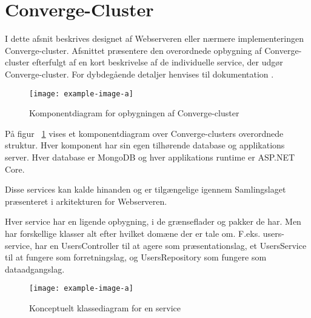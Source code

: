 \section{Converge-Cluster}

I dette afsnit beskrives designet af Webserveren eller nærmere implementeringen Converge-cluster. Afsnittet præsentere den overordnede opbygning af Converge-cluster efterfulgt af en kort beskrivelse af de individuelle service, der udgør Converge-cluster. For dybdegående detaljer henvises til dokumentation .


\begin{figure}
  \begin{small}
    \begin{center}
      \texttt{[image: example-image-a]}
    \end{center}
    \caption{Komponentdiagram for opbygningen af Converge-cluster}
    \label{fig:component-converge-cluster}
  \end{small}
\end{figure}

På figur ~\ref{fig:component-converge-cluster} vises et komponentdiagram over Converge-clusters overordnede struktur. Hver komponent har sin egen tilhørende database og applikations server. Hver database er MongoDB og hver applikations runtime er ASP.NET Core.

Disse services kan kalde hinanden og er tilgængelige igennem Samlingslaget præsenteret i arkitekturen for Webserveren. 

Hver service har en ligende opbygning, i de grænseflader og pakker de har. Men har forskellige klasser alt efter hvilket domæne der er tale om. F.eks. users-service, har en UsersController til at agere som præsentationslag, et UsersService til at fungere som forretningslag, og UsersRepository som fungere som dataadgangslag.


\begin{figure}
  \begin{small}
    \begin{center}
      \texttt{[image: example-image-a]}
    \end{center}
    \caption{Konceptuelt klassediagram for en service}
    \label{fig:conceptual-class-service}
  \end{small}
\end{figure}

